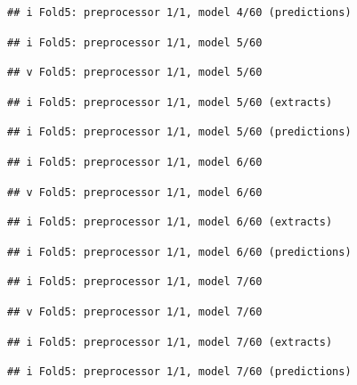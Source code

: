 \documentclass[
]{article}
\begin{document}
\begin{verbatim}
## i Fold5: preprocessor 1/1, model 4/60 (predictions)
\end{verbatim}

\begin{verbatim}
## i Fold5: preprocessor 1/1, model 5/60
\end{verbatim}

\begin{verbatim}
## v Fold5: preprocessor 1/1, model 5/60
\end{verbatim}

\begin{verbatim}
## i Fold5: preprocessor 1/1, model 5/60 (extracts)
\end{verbatim}

\begin{verbatim}
## i Fold5: preprocessor 1/1, model 5/60 (predictions)
\end{verbatim}

\begin{verbatim}
## i Fold5: preprocessor 1/1, model 6/60
\end{verbatim}

\begin{verbatim}
## v Fold5: preprocessor 1/1, model 6/60
\end{verbatim}

\begin{verbatim}
## i Fold5: preprocessor 1/1, model 6/60 (extracts)
\end{verbatim}

\begin{verbatim}
## i Fold5: preprocessor 1/1, model 6/60 (predictions)
\end{verbatim}

\begin{verbatim}
## i Fold5: preprocessor 1/1, model 7/60
\end{verbatim}

\begin{verbatim}
## v Fold5: preprocessor 1/1, model 7/60
\end{verbatim}

\begin{verbatim}
## i Fold5: preprocessor 1/1, model 7/60 (extracts)
\end{verbatim}

\begin{verbatim}
## i Fold5: preprocessor 1/1, model 7/60 (predictions)
\end{verbatim}
\end{document}
